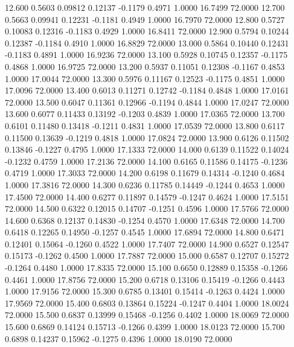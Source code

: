   12.600   0.5603   0.09812   0.12137  -0.1179   0.4971   1.0000  16.7499  72.0000
  12.700   0.5663   0.09941   0.12231  -0.1181   0.4949   1.0000  16.7970  72.0000
  12.800   0.5727   0.10083   0.12316  -0.1183   0.4929   1.0000  16.8411  72.0000
  12.900   0.5794   0.10244   0.12387  -0.1184   0.4910   1.0000  16.8829  72.0000
  13.000   0.5864   0.10440   0.12431  -0.1183   0.4891   1.0000  16.9236  72.0000
  13.100   0.5928   0.10745   0.12357  -0.1175   0.4868   1.0000  16.9725  72.0000
  13.200   0.5937   0.11051   0.12308  -0.1167   0.4853   1.0000  17.0044  72.0000
  13.300   0.5976   0.11167   0.12523  -0.1175   0.4851   1.0000  17.0096  72.0000
  13.400   0.6013   0.11271   0.12742  -0.1184   0.4848   1.0000  17.0161  72.0000
  13.500   0.6047   0.11361   0.12966  -0.1194   0.4844   1.0000  17.0247  72.0000
  13.600   0.6077   0.11433   0.13192  -0.1203   0.4839   1.0000  17.0365  72.0000
  13.700   0.6101   0.11480   0.13418  -0.1211   0.4831   1.0000  17.0539  72.0000
  13.800   0.6117   0.11500   0.13639  -0.1219   0.4818   1.0000  17.0824  72.0000
  13.900   0.6126   0.11502   0.13846  -0.1227   0.4795   1.0000  17.1333  72.0000
  14.000   0.6139   0.11522   0.14024  -0.1232   0.4759   1.0000  17.2136  72.0000
  14.100   0.6165   0.11586   0.14175  -0.1236   0.4719   1.0000  17.3033  72.0000
  14.200   0.6198   0.11679   0.14314  -0.1240   0.4684   1.0000  17.3816  72.0000
  14.300   0.6236   0.11785   0.14449  -0.1244   0.4653   1.0000  17.4500  72.0000
  14.400   0.6277   0.11897   0.14579  -0.1247   0.4624   1.0000  17.5151  72.0000
  14.500   0.6322   0.12015   0.14707  -0.1251   0.4596   1.0000  17.5766  72.0000
  14.600   0.6368   0.12137   0.14830  -0.1254   0.4570   1.0000  17.6348  72.0000
  14.700   0.6418   0.12265   0.14950  -0.1257   0.4545   1.0000  17.6894  72.0000
  14.800   0.6471   0.12401   0.15064  -0.1260   0.4522   1.0000  17.7407  72.0000
  14.900   0.6527   0.12547   0.15173  -0.1262   0.4500   1.0000  17.7887  72.0000
  15.000   0.6587   0.12707   0.15272  -0.1264   0.4480   1.0000  17.8335  72.0000
  15.100   0.6650   0.12889   0.15358  -0.1266   0.4461   1.0000  17.8756  72.0000
  15.200   0.6718   0.13106   0.15419  -0.1266   0.4443   1.0000  17.9156  72.0000
  15.300   0.6785   0.13401   0.15414  -0.1263   0.4424   1.0000  17.9569  72.0000
  15.400   0.6803   0.13864   0.15224  -0.1247   0.4404   1.0000  18.0024  72.0000
  15.500   0.6837   0.13999   0.15468  -0.1256   0.4402   1.0000  18.0069  72.0000
  15.600   0.6869   0.14124   0.15713  -0.1266   0.4399   1.0000  18.0123  72.0000
  15.700   0.6898   0.14237   0.15962  -0.1275   0.4396   1.0000  18.0190  72.0000
